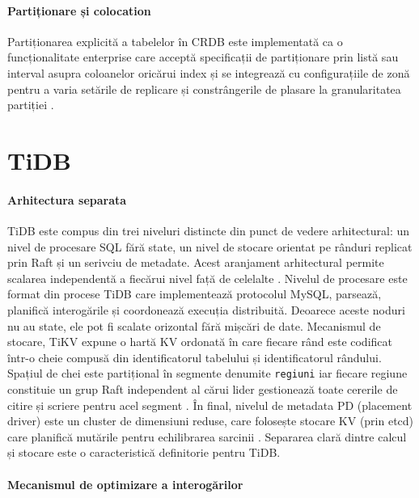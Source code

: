 \paragraph{Partiționare și colocation}

Partiționarea explicită a tabelelor în CRDB este implementată ca o funcționalitate enterprise care acceptă specificații de partiționare prin listă sau interval asupra coloanelor oricărui index și se integrează cu configurațiile de zonă pentru a varia setările de replicare și constrângerile de plasare la granularitatea partiției \cite{crdb_arch_overview}.

\section{TiDB}

\paragraph{Arhitectura separata}

TiDB este compus din trei niveluri distincte din punct de vedere arhitectural: un nivel de procesare SQL fără state, un nivel de stocare orientat pe rânduri replicat prin Raft și un serivciu de metadate. Acest aranjament arhitectural permite scalarea independentă a fiecărui nivel față de celelalte \cite{huangtidb2020}. Nivelul de procesare este format din procese TiDB care implementează protocolul MySQL, parsează, planifică interogările și coordonează execuția distribuită. Deoarece aceste noduri nu au state, ele pot fi scalate orizontal fără mișcări de date. Mecanismul de stocare, TiKV expune o hartă KV ordonată în care fiecare rând este codificat într-o cheie compusă din identificatorul tabelului și identificatorul rândului. Spațiul de chei este partițional în segmente denumite \texttt{regiuni} iar fiecare regiune constituie un grup Raft independent al cărui lider gestionează toate cererile de citire și scriere pentru acel segment \cite{huangtidb2020}. În final, nivelul de metadata PD (placement driver) este un cluster de dimensiuni reduse, care folosește stocare KV (prin etcd) care planifică mutările pentru echilibrarea sarcinii \cite{huangtidb2020}. Separarea clară dintre calcul și stocare este o caracteristică definitorie pentru TiDB.

\paragraph{Mecanismul de optimizare a interogărilor}


